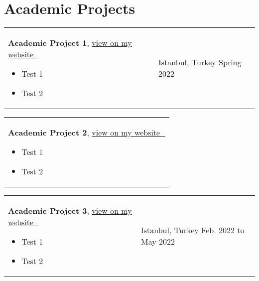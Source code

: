 \documentclass[10pt, a4paper]{article}
\newenvironment{highlights}{
        \begin{itemize}[
                topsep=0pt,
                parsep=0.07 cm,
                partopsep=0pt,
                itemsep=0pt,
                after=\vspace*{-1\baselineskip},
                leftmargin=0.6 cm + 3pt
            ]
    }{
        \end{itemize}
    } %
\let\hrefWithoutArrow\href
\renewcommand{\href}[2]{\hrefWithoutArrow{#1}{#2\, \raisebox{.1ex}{\footnotesize \faExternalLink*}}}
\begin{document}
    \section{Academic Projects}
    
        \begin{tabularx}{ cm-0.13cm}{K{0.2 cm} R{3.6 cm}}
            \textbf{Academic Project 1}, \href{https://example.com/}{view on my website}
            \vspace*{0.12 cm}
            \begin{highlights}
                \item Test 1
                \item Test 2
            \end{highlights}
        &
            Istanbul, Turkey \newline
            Spring 2022
        \end{tabularx}

        \vspace*{0.12 cm}
        
        \begin{tabularx}{ cm-0.13cm}{K{0.2 cm}}
            \textbf{Academic Project 2}, \href{https://example.com/}{view on my website}
            \vspace*{0.12 cm}
            \begin{highlights}
                \item Test 1
                \item Test 2
            \end{highlights}
        \end{tabularx}

        \vspace*{0.12 cm}
        
        \begin{tabularx}{ cm-0.13cm}{K{0.2 cm} R{3.6 cm}}
            \textbf{Academic Project 3}, \href{https://example.com/}{view on my website}
            \vspace*{0.12 cm}
            \begin{highlights}
                \item Test 1
                \item Test 2
            \end{highlights}
        &
            Istanbul, Turkey \newline
            Feb. 2022 to May 2022
        \end{tabularx}
\end{document}
